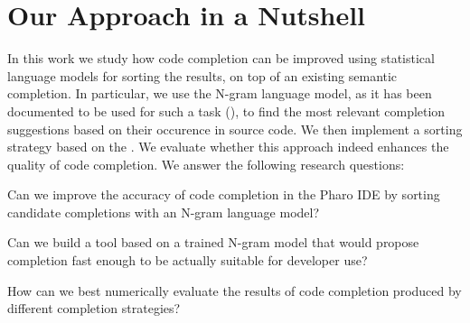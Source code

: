 \section{Our Approach in a Nutshell}
\label{sec:Introduction-Approach}
In this work we study how code completion can be improved using statistical language models for sorting the results, on top of an existing semantic completion. In particular, we use the N-gram language model, as it has been documented to be used for such a task (\cite{Hind12a}), to find the most relevant completion suggestions based on their occurence in source code. We then implement a sorting strategy based on the  . We evaluate whether this approach indeed enhances the quality of code completion. We answer the following research questions:
\begin{RQ}
    \item Can we improve the accuracy of code completion in the Pharo IDE by sorting candidate completions with an N-gram language model?
    \item Can we build a tool based on a trained N-gram model that would propose completion fast enough to be actually suitable for developer use? 
    \item How can we best numerically evaluate the results of code completion produced by different completion strategies?
\end{RQ}

